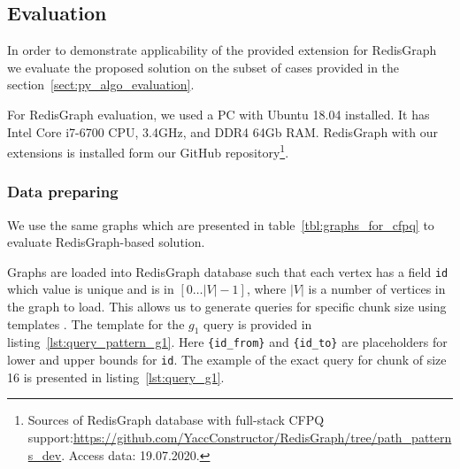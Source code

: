 


\subsection{Evaluation}

In order to demonstrate applicability of the provided extension for RedisGraph we evaluate the proposed solution on the subset of cases provided in the section~\ref{sect:py_algo_evaluation}.

For RedisGraph evaluation, we used a PC with Ubuntu 18.04 installed.
It has Intel Core i7-6700 CPU, 3.4GHz, and DDR4 64Gb RAM. 
RedisGraph with our extensions is installed form our GitHub repository\footnote{Sources of RedisGraph database with full-stack CFPQ support:\url{https://github.com/YaccConstructor/RedisGraph/tree/path_patterns_dev}. Access data: 19.07.2020.}. 

\subsubsection{Data preparing}

We use the same graphs which are presented in table~\ref{tbl:graphs_for_cfpq} to evaluate RedisGraph-based solution.

Graphs are loaded into RedisGraph database such that each vertex has a field  \verb|id| which value is unique and is in $[0 \ldots |V|-1]$, where $|V|$ is a number of vertices in the graph to load.
This allows us to generate queries for specific chunk size using templates .
The template for the $g_1$ query is provided in listing~\ref{lst:query_pattern_g1}.
Here \texttt{\{id\_from\}} and \texttt{\{id\_to\}} are placeholders for lower and upper bounds for \verb|id|. The example of the exact query for chunk of size 16 is presented in listing~\ref{lst:query_g1}.

